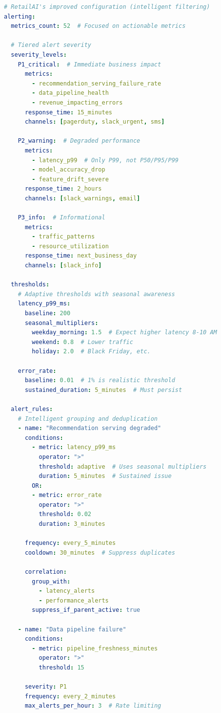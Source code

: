 \begin{lstlisting}[language=yaml, caption={Intelligent Alert Management Configuration}]
# RetailAI's improved configuration (intelligent filtering)
alerting:
  metrics_count: 52  # Focused on actionable metrics

  # Tiered alert severity
  severity_levels:
    P1_critical:  # Immediate business impact
      metrics:
        - recommendation_serving_failure_rate
        - data_pipeline_health
        - revenue_impacting_errors
      response_time: 15_minutes
      channels: [pagerduty, slack_urgent, sms]

    P2_warning:  # Degraded performance
      metrics:
        - latency_p99  # Only P99, not P50/P95/P99
        - model_accuracy_drop
        - feature_drift_severe
      response_time: 2_hours
      channels: [slack_warnings, email]

    P3_info:  # Informational
      metrics:
        - traffic_patterns
        - resource_utilization
      response_time: next_business_day
      channels: [slack_info]

  thresholds:
    # Adaptive thresholds with seasonal awareness
    latency_p99_ms:
      baseline: 200
      seasonal_multipliers:
        weekday_morning: 1.5  # Expect higher latency 8-10 AM
        weekend: 0.8  # Lower traffic
        holiday: 2.0  # Black Friday, etc.

    error_rate:
      baseline: 0.01  # 1% is realistic threshold
      sustained_duration: 5_minutes  # Must persist

  alert_rules:
    # Intelligent grouping and deduplication
    - name: "Recommendation serving degraded"
      conditions:
        - metric: latency_p99_ms
          operator: ">"
          threshold: adaptive  # Uses seasonal multipliers
          duration: 5_minutes  # Sustained issue
        OR:
        - metric: error_rate
          operator: ">"
          threshold: 0.02
          duration: 3_minutes

      frequency: every_5_minutes
      cooldown: 30_minutes  # Suppress duplicates

      correlation:
        group_with:
          - latency_alerts
          - performance_alerts
        suppress_if_parent_active: true

    - name: "Data pipeline failure"
      conditions:
        - metric: pipeline_freshness_minutes
          operator: ">"
          threshold: 15

      severity: P1
      frequency: every_2_minutes
      max_alerts_per_hour: 3  # Rate limiting


\end{lstlisting}
